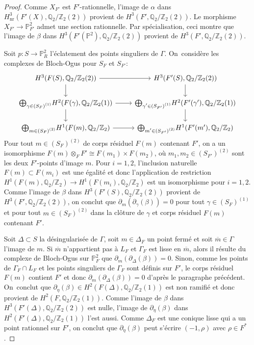 \documentclass[JEP,XML,SOM,Unicode,francais,published]{cedram}
\theoremstyle{definition}
\newcommand{\Q}{\mathbb Q}
\newcommand{\Z}{\mathbb Z}
\renewcommand{\P}{\mathbb P}
\newcommand{\cl}{\overline}
\newcommand{\on}[1]{\operatorname{#1}}
\begin{document}
\begin{proof}
Comme $X_{F'}$ est $F'$-rationnelle, l'image de $\alpha$ dans $H^3_{\on{nr}}(F'(X),\Q_2/\Z_2(2))$ provient de $H^3(F',\Q_2/\Z_2(2))$. Le morphisme $X_{F'}\to \P^2_{F'}$ admet une section rationnelle. Par spécialisation, ceci montre que l'image de $\beta$ dans $H^3(F'(\P^2),\Q_2/\Z_2(2))$ provient de $H^3(F',\Q_2/\Z_2(2))$.

Soit $p \colon S \to \P^2_{R}$ l'éclatement des points singuliers de $\Gamma$. On~considère les complexes de Bloch-Ogus pour $S_F$ et $S_{F'}$:
\[
\begin{tikzcd}
H^3(F(S),\Q_2/\Z_2(2))\arrow[r] \arrow[d] & H^3(F'(S),\Q_2/\Z_2(2)) \arrow[d] \\
{\smash{\bigoplus_{\substack{\gamma\in (S_F)^{(1)}}}} H^2(F(\gamma),\Q_2/\Z_2(1))} \arrow[r] \arrow[d] &
{\smash{\bigoplus_{\substack{\gamma'\in (S_{F'})^{(1)}}}} H^2(F'(\gamma'),\Q_2/\Z_2(1))} \arrow[d] \\
{\smash{\bigoplus_{\substack{m\in (S_F)^{(2)}}}} H^1(F(m),\Q_2/\Z_2)} \arrow[r] &
{\smash{\bigoplus_{\substack{m'\in (S_{F'})^{(2)}}}} H^1(F'(m'),\Q_2/\Z_2)}
\end{tikzcd}
\]
Pour tout $m\in (S_F)^{(2)}$ de corps résiduel $F(m)$ contenant $F'$, on a un isomorphisme $F(m)\otimes_F F'\cong F(m_1)\times F(m_2)$, où $m_1,m_2\in (S_{F'})^{(2)}$ sont les deux $F'$-points d'image $m$. Pour $i=1,2$, l'inclusion naturelle $F(m)\subset F(m_i)$ est une égalité et donc l'application de restriction $H^1(F(m),\Q_2/\Z_2)\to H^1(F(m_i),\Q_2/\Z_2)$ est un isomorphisme pour $i=1,2$. Comme l'image de $\beta$ dans $H^3(F'(S),\Q_2/\Z_2(2))$ provient de $H^3(F',\Q_2/\Z_2(2))$, on conclut que $\partial_m(\partial_\gamma(\beta))=0$ pour tout $\gamma\in (S_F)^{(1)}$ et pour tout $m\in (S_F)^{(2)}$ dans la clôture de $\gamma$ et corps résiduel $F(m)$ contenant $F'$.

Soit $\Delta \subset S$ la désingularisée de $\Gamma$, soit $m\in \Delta_F$ un point fermé et soit $\cl{m}\in \Gamma$ l'image de $m$. Si $\cl{m}$ n'appartient pas à $L_F$ et $\Gamma_F$ est lisse en $\cl{m}$, alors il résulte du complexe de Bloch-Ogus sur $\P^2_F$ que $\partial_m(\partial_\Delta(\beta))=0$. Sinon, comme les points de $\Gamma_F\cap L_F$ et les points singuliers de $\Gamma_F$ sont définis sur $F'$, le corps résiduel $F(m)$ contient $F'$ et donc $\partial_m(\partial_\Delta(\beta))=0$ d'après le paragraphe précédent. On~conclut que $\partial_{\eta}(\beta) \in H^2(F(\Delta),\Q_2/\Z_2(1))$ est non ramifié et donc provient de $H^2(F,\Q_2/\Z_2(1))$. Comme l'image de $\beta$ dans $H^3(F'(\Delta),\Q_2/\Z_2(2))$ est nulle, l'image de $\partial_{\eta}(\beta)$ dans $H^2(F'(\Delta),\Q_2/\Z_2(1))$ l'est aussi. Comme $\Delta_{F}$ est une conique lisse qui a un point rationnel sur $F'$, on conclut que $\partial_{\eta}(\beta)$ peut s'écrire $(-1,\rho)$ avec $\rho \in F^*$.


\end{proof}
\end{document}
